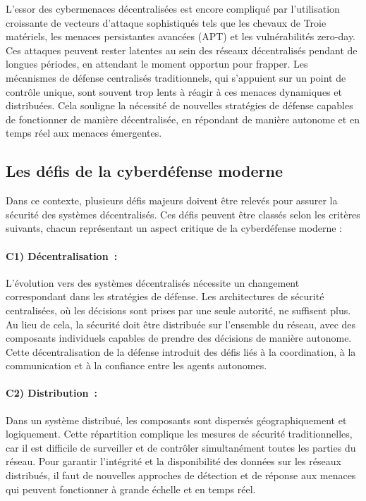 L'essor des cybermenaces décentralisées est encore compliqué par l'utilisation croissante de vecteurs d'attaque sophistiqués tels que les chevaux de Troie matériels, les menaces persistantes avancées (APT) et les vulnérabilités zero-day. Ces attaques peuvent rester latentes au sein des réseaux décentralisés pendant de longues périodes, en attendant le moment opportun pour frapper. Les mécanismes de défense centralisés traditionnels, qui s'appuient sur un point de contrôle unique, sont souvent trop lents à réagir à ces menaces dynamiques et distribuées. Cela souligne la nécessité de nouvelles stratégies de défense capables de fonctionner de manière décentralisée, en répondant de manière autonome et en temps réel aux menaces émergentes.

\subsection{Les défis de la cyberdéfense moderne}

Dans ce contexte, plusieurs défis majeurs doivent être relevés pour assurer la sécurité des systèmes décentralisés. Ces défis peuvent être classés selon les critères suivants, chacun représentant un aspect critique de la cyberdéfense moderne :

\paragraph{C1) Décentralisation :}
L'évolution vers des systèmes décentralisés nécessite un changement correspondant dans les stratégies de défense. Les architectures de sécurité centralisées, où les décisions sont prises par une seule autorité, ne suffisent plus. Au lieu de cela, la sécurité doit être distribuée sur l'ensemble du réseau, avec des composants individuels capables de prendre des décisions de manière autonome. Cette décentralisation de la défense introduit des défis liés à la coordination, à la communication et à la confiance entre les agents autonomes.

\paragraph{C2) Distribution :}
Dans un système distribué, les composants sont dispersés géographiquement et logiquement. Cette répartition complique les mesures de sécurité traditionnelles, car il est difficile de surveiller et de contrôler simultanément toutes les parties du réseau. Pour garantir l'intégrité et la disponibilité des données sur les réseaux distribués, il faut de nouvelles approches de détection et de réponse aux menaces qui peuvent fonctionner à grande échelle et en temps réel.

